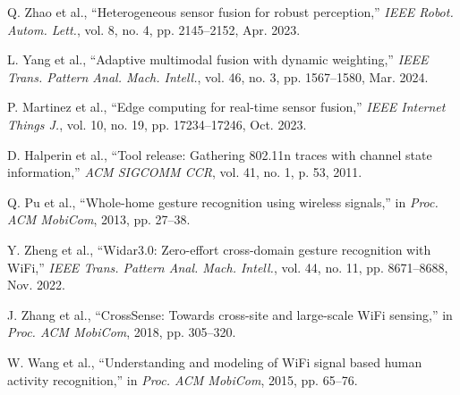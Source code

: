 \documentclass[journal]{IEEEtran}
\begin{document}
\begin{thebibliography}{99}
Q. Zhao et al., ``Heterogeneous sensor fusion for robust perception,'' \textit{IEEE Robot. Autom. Lett.}, vol. 8, no. 4, pp. 2145--2152, Apr. 2023.

L. Yang et al., ``Adaptive multimodal fusion with dynamic weighting,'' \textit{IEEE Trans. Pattern Anal. Mach. Intell.}, vol. 46, no. 3, pp. 1567--1580, Mar. 2024.

P. Martinez et al., ``Edge computing for real-time sensor fusion,'' \textit{IEEE Internet Things J.}, vol. 10, no. 19, pp. 17234--17246, Oct. 2023.

D. Halperin et al., ``Tool release: Gathering 802.11n traces with channel state information,'' \textit{ACM SIGCOMM CCR}, vol. 41, no. 1, p. 53, 2011.

Q. Pu et al., ``Whole-home gesture recognition using wireless signals,'' in \textit{Proc. ACM MobiCom}, 2013, pp. 27--38.

Y. Zheng et al., ``Widar3.0: Zero-effort cross-domain gesture recognition with WiFi,'' \textit{IEEE Trans. Pattern Anal. Mach. Intell.}, vol. 44, no. 11, pp. 8671--8688, Nov. 2022.

J. Zhang et al., ``CrossSense: Towards cross-site and large-scale WiFi sensing,'' in \textit{Proc. ACM MobiCom}, 2018, pp. 305--320.

W. Wang et al., ``Understanding and modeling of WiFi signal based human activity recognition,'' in \textit{Proc. ACM MobiCom}, 2015, pp. 65--76.

\end{thebibliography}
\end{document}
